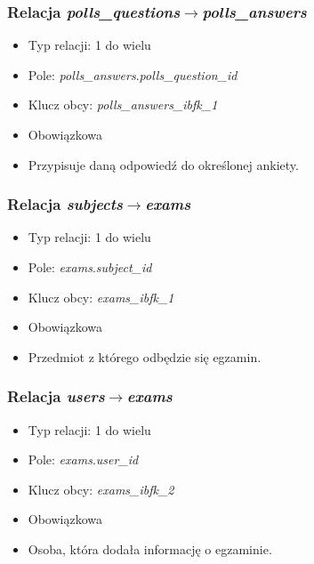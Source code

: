 \documentclass[a4paper,12pt,oneside]{report}
\begin{document}
\subsubsection{Relacja \emph{polls\_questions}$\to$\emph{polls\_answers}}
\label{subsub:polls_questions-polls_answers}
\begin{itemize}
  \item Typ relacji: 1 do wielu
  \item Pole: \emph{polls\_answers}.\emph{polls\_question\_id}
  \item Klucz obcy: \emph{polls\_answers\_ibfk\_1}
  \item Obowiązkowa
  \item Przypisuje daną odpowiedź do określonej ankiety.
\end{itemize}

\subsubsection{Relacja \emph{subjects}$\to$\emph{exams}}
\label{subsub:subjects-exams}
\begin{itemize}
  \item Typ relacji: 1 do wielu
  \item Pole: \emph{exams}.\emph{subject\_id}
  \item Klucz obcy: \emph{exams\_ibfk\_1}
  \item Obowiązkowa
  \item Przedmiot z którego odbędzie się egzamin.
\end{itemize}

\subsubsection{Relacja \emph{users}$\to$\emph{exams}}
\label{subsub:users-exams}
\begin{itemize}
  \item Typ relacji: 1 do wielu
  \item Pole: \emph{exams}.\emph{user\_id}
  \item Klucz obcy: \emph{exams\_ibfk\_2}
  \item Obowiązkowa
  \item Osoba, która dodała informację o egzaminie.
\end{itemize}
\end{document}
